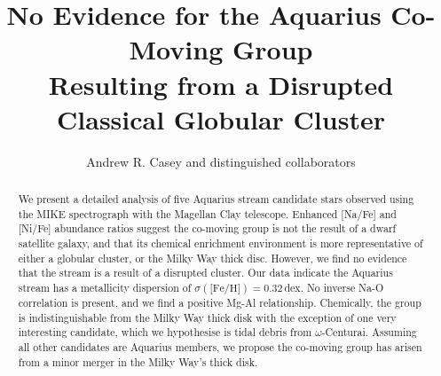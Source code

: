 \documentclass{emulateapj}
\begin{document}
\title{No Evidence for the Aquarius Co-Moving Group \\Resulting from a Disrupted Classical Globular Cluster}




\author{Andrew R. Casey and distinguished collaborators}


\begin{abstract}
We present a detailed analysis of five Aquarius stream candidate stars observed using the MIKE spectrograph with the Magellan Clay telescope.  Enhanced [Na/Fe] and [Ni/Fe] abundance ratios suggest the co-moving group is not the result of a dwarf satellite galaxy, and that its chemical enrichment environment is more representative of either a globular cluster, or the Milky Way thick disc. However, we find no evidence that the stream is a result of a disrupted cluster. Our data indicate the Aquarius stream has a  metallicity dispersion of $\sigma(\mbox{[Fe/H}]) = 0.32$\,dex. No inverse Na-O correlation is present, and we find a positive Mg-Al relationship. Chemically, the group is indistinguishable from the Milky Way thick disk with the exception of one very interesting candidate, which we hypothesise is tidal debris from $\omega$-Centurai. Assuming all other candidates are Aquarius members, we propose the co-moving group has arisen from a minor merger in the Milky Way's thick disk.

\end{abstract}
\end{document}
